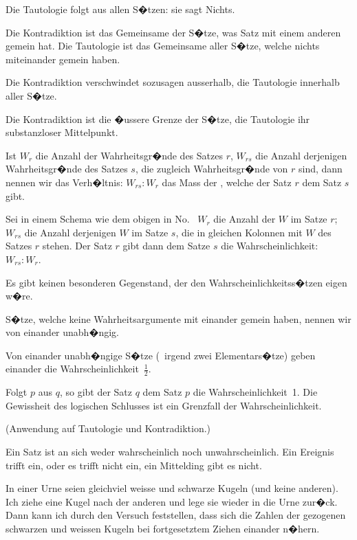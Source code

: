 \begin{propositions}
{Die Tautologie folgt aus allen S�tzen: sie sagt
Nichts.}


{Die Kontradiktion ist das Gemeinsame der
S�tze, was  Satz mit einem anderen gemein
hat. Die Tautologie ist das Gemeinsame aller
S�tze, welche nichts miteinander gemein haben.

Die Kontradiktion verschwindet sozusagen
ausserhalb, die Tautologie innerhalb aller S�tze.

Die Kontradiktion ist die �ussere Grenze der
S�tze, die Tautologie ihr substanzloser Mittelpunkt.}


{Ist $W_{r}$ die Anzahl der Wahrheitsgr�nde des
Satzes \glqq{}$r$\grqq{}, $W_{rs}$ die Anzahl derjenigen Wahrheitsgr�nde
des Satzes \glqq{}$s$\grqq{}, die zugleich Wahrheitsgr�nde
von \glqq{}$r$\grqq{} sind, dann nennen wir das Verh�ltnis: $W_{rs} :
W_{r}$ das Mass der , welche
der Satz \glqq{}$r$\grqq{} dem Satz \glqq{}$s$\grqq{} gibt.}


{Sei in einem Schema wie dem obigen in No.~
$W_{r}$ die Anzahl der \glqq{}$W$\grqq{} im Satze $r$; $W_{rs}$ die
Anzahl derjenigen \glqq{}$W$\grqq{} im Satze $s$, die in gleichen
Kolonnen mit \glqq{}$W$\grqq{} des Satzes $r$ stehen. Der Satz
$r$ gibt dann dem Satze $s$ die Wahrscheinlichkeit:
$W_{rs} : W_{r}$.}


{Es gibt keinen besonderen Gegenstand, der den
Wahrscheinlichkeitss�tzen eigen w�re.}


{S�tze, welche keine Wahrheitsargumente mit
einander gemein haben, nennen wir von einander
unabh�ngig.

Von einander unabh�ngige S�tze (\zumBeispiel\ irgend
zwei Elementars�tze) geben einander die Wahrscheinlichkeit~$\frac{1}{2}$.

Folgt $p$ aus $q$, so gibt der Satz \glqq{}$q$\grqq{} dem Satz
\glqq{}$p$\grqq{} die Wahrscheinlichkeit~1. Die Gewissheit
des logischen Schlusses ist ein Grenzfall der
Wahrscheinlichkeit.

(Anwendung auf Tautologie und Kontradiktion.)}


{Ein Satz ist an sich weder wahrscheinlich noch
unwahrscheinlich. Ein Ereignis trifft ein, oder
es trifft nicht ein, ein Mittelding gibt es nicht.}


{In einer Urne seien gleichviel weisse und
schwarze Kugeln (und keine anderen). Ich ziehe
eine Kugel nach der anderen und lege sie wieder
in die Urne zur�ck. Dann kann ich durch den
Versuch feststellen, dass sich die Zahlen der
gezogenen schwarzen und weissen Kugeln bei
fortgesetztem Ziehen einander n�hern.

}
\end{propositions}
